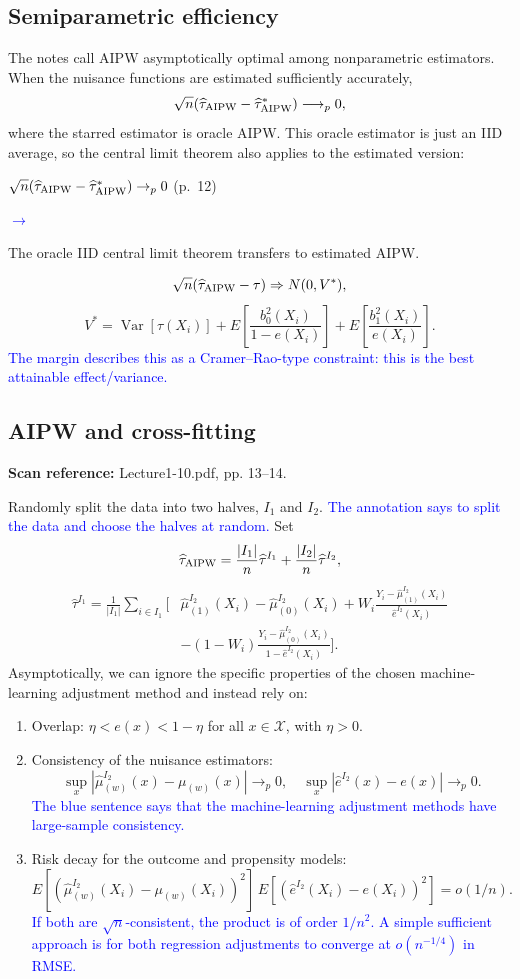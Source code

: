 \documentclass[11pt,a4paper]{article}
\newcommand{\sourcepages}[1]{\par{\small\sffamily\color{muted}\textbf{Scan reference:} #1\par}\nobreak\smallskip\nopagebreak[4]}
\newcommand{\inkblue}[1]{\textcolor{blue}{#1}}
\newcommand{\notearrow}[3]{%
\par\Needspace{6\baselineskip}\smallskip
\noindent\begin{minipage}[c]{0.43\linewidth}\raggedright\color{#1}#2\end{minipage}%
\hfill\textcolor{#1}{\(\longrightarrow\)}\hfill%
\begin{minipage}[c]{0.43\linewidth}\raggedright#3\end{minipage}\par\smallskip}
\begin{document}
\subsection{Semiparametric efficiency}
The notes call AIPW asymptotically optimal among nonparametric estimators. When the nuisance functions are estimated sufficiently accurately,
\[
\sqrt n(\widehat\tau_{\rm AIPW}-\widehat\tau^*_{\rm AIPW})\longrightarrow_p0,
\]
where the starred estimator is oracle AIPW. This oracle estimator is just an IID average, so the central limit theorem also applies to the estimated version:
\notearrow{blue}{$\sqrt n(\widehat\tau_{\rm AIPW}-\widehat\tau^*_{\rm AIPW})\to_p0$ (p.~12)}{The oracle IID central limit theorem transfers to estimated AIPW.}

\[
\sqrt n(\widehat\tau_{\rm AIPW}-\tau)\Rightarrow N(0,V^*),
\]
\[
V^*=\operatorname{Var}[\tau(X_i)]
+E\left[\frac{b_0^2(X_i)}{1-e(X_i)}\right]
+E\left[\frac{b_1^2(X_i)}{e(X_i)}\right].
\]
\inkblue{The margin describes this as a Cramer--Rao-type constraint: this is the best attainable effect/variance.}
\subsection{AIPW and cross-fitting}
\sourcepages{Lecture1-10.pdf, pp. 13--14.}
Randomly split the data into two halves, $I_1$ and $I_2$. \inkblue{The annotation says to split the data and choose the halves at random.} Set
\[
\widehat\tau_{\rm AIPW}=\frac{|I_1|}{n}\widehat\tau^{I_1}
+\frac{|I_2|}{n}\widehat\tau^{I_2},
\]
\begin{align*}
\widehat\tau^{I_1}=\frac1{|I_1|}\sum_{i\in I_1}\bigg[&\widehat\mu_{(1)}^{I_2}(X_i)-\widehat\mu_{(0)}^{I_2}(X_i)
+W_i\frac{Y_i-\widehat\mu_{(1)}^{I_2}(X_i)}{\widehat e^{I_2}(X_i)}\\
&-(1-W_i)\frac{Y_i-\widehat\mu_{(0)}^{I_2}(X_i)}{1-\widehat e^{I_2}(X_i)}\bigg].
\end{align*}
Asymptotically, we can ignore the specific properties of the chosen machine-learning adjustment method and instead rely on:
\begin{enumerate}
\item Overlap: $\eta<e(x)<1-\eta$ for all $x\in\mathcal X$, with $\eta>0$.
\item Consistency of the nuisance estimators:
\[
\sup_x|\widehat\mu_{(w)}^{I_2}(x)-\mu_{(w)}(x)|\longrightarrow_p0,
\quad \sup_x|\widehat e^{I_2}(x)-e(x)|\longrightarrow_p0.
\]
\inkblue{The blue sentence says that the machine-learning adjustment methods have large-sample consistency.}
\item Risk decay for the outcome and propensity models:
\[
E[(\widehat\mu_{(w)}^{I_2}(X_i)-\mu_{(w)}(X_i))^2]\,
E[(\widehat e^{I_2}(X_i)-e(X_i))^2]=o(1/n).
\]
\inkblue{If both are $\sqrt n$-consistent, the product is of order $1/n^2$. A simple sufficient approach is for both regression adjustments to converge at $o(n^{-1/4})$ in RMSE.}
\end{enumerate}
\end{document}
